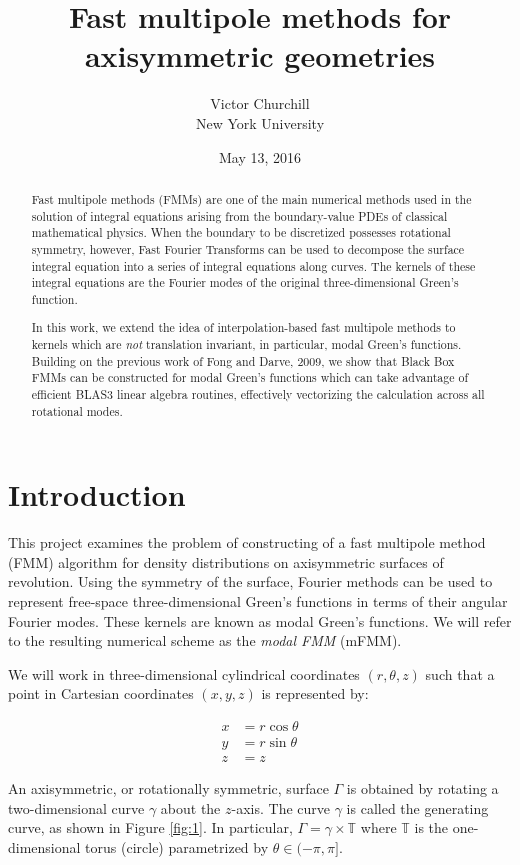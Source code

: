 \documentclass[11pt, oneside]{article}   	%
\title{Fast multipole methods for axisymmetric geometries}
\author{Victor Churchill\\New York University}
\date{May 13, 2016}
\begin{document}
\maketitle

\begin{abstract}
Fast multipole methods (FMMs) are one of the main numerical methods used in the solution of integral equations arising from the boundary-value PDEs of classical mathematical physics. When the boundary to be discretized possesses rotational symmetry, however, Fast Fourier Transforms can be used to decompose the surface integral equation into a series of integral equations along curves. The kernels of these integral equations are the Fourier modes of the original three-dimensional Green's function.

In this work, we extend the idea of interpolation-based fast multipole methods to kernels which are \textit{not} translation invariant, in particular, modal Green's functions. Building on the previous work of Fong and Darve, 2009, we show that Black Box FMMs can be constructed for modal Green's functions which can take advantage of efficient BLAS3 linear algebra routines, effectively vectorizing the calculation across all rotational modes.
\end{abstract}

\section{Introduction}
This project examines the problem of constructing of a fast multipole method (FMM) algorithm for density distributions on axisymmetric surfaces of revolution. Using the symmetry of the surface, Fourier methods can be used to represent free-space three-dimensional Green's functions in terms of their angular Fourier modes. These kernels are known as modal Green's functions. We will refer to the resulting numerical scheme as the \textit{modal FMM} (mFMM).

We will work in three-dimensional cylindrical coordinates $(r,\theta,z)$ such that a point in Cartesian coordinates $(x,y,z)$ is represented by:

\begin{align*}
x &= r\cos\theta\\
y &= r\sin\theta\\
z &= z
\end{align*}

An axisymmetric, or rotationally symmetric, surface $\Gamma$ is obtained by rotating a two-dimensional curve $\gamma$ about the $z$-axis. The curve $\gamma$ is called the generating curve, as shown in Figure \ref{fig:1}. In particular, $\Gamma=\gamma\times\mathbb{T}$ where $\mathbb{T}$ is the one-dimensional torus (circle) parametrized by $\theta\in(-\pi,\pi]$.
\end{document}
